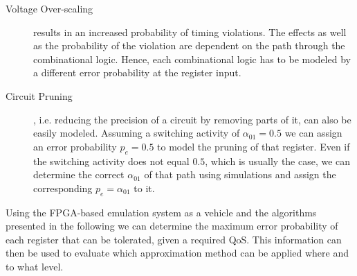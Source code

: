 \documentclass[10pt,twocolumn]{IEEEtran} %
\begin{document}
\begin{description}
\item[Voltage Over-scaling] results in an increased probability of timing violations. The effects as well as the probability of the violation are dependent on the path through the combinational logic. Hence, each combinational logic has to be modeled by a different error probability at the register input.
\item[Circuit Pruning], i.e. reducing the precision of a circuit by removing parts of it, can also be easily modeled. Assuming a switching activity of $\alpha_{01}=0.5$ we can assign an error probability $p_e=0.5$ to model the pruning of that register. Even if the switching activity does not equal $0.5$, which is usually the case, we can determine the correct $\alpha_{01}$ of that path using simulations and assign the corresponding $p_e=\alpha_{01}$ to it.
\end{description}
Using the FPGA-based emulation system as a vehicle and the algorithms presented in the following we can determine the maximum error probability of each register that can be tolerated, given a required QoS. This information can then be used to evaluate which approximation method can be applied where and to what level.
\end{document}
